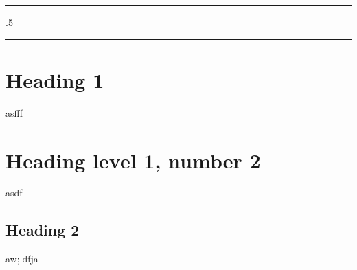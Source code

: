 \documentclass[
]
{article}
\begin{document}
\centerline{\huge \bf }

\vspace{2 mm}

\hrule

\vspace{2 mm}



\moveleft.5\hoffset\centerline{         }



\vspace{2 mm}

\hrule



\hypertarget{heading-1}{%
\section{Heading 1}\label{heading-1}}

asfff

\hypertarget{heading-level-1-number-2}{%
\section{Heading level 1, number 2}\label{heading-level-1-number-2}}

asdf

\hypertarget{heading-2}{%
\subsection{Heading 2}\label{heading-2}}

aw;ldfja
\end{document}
